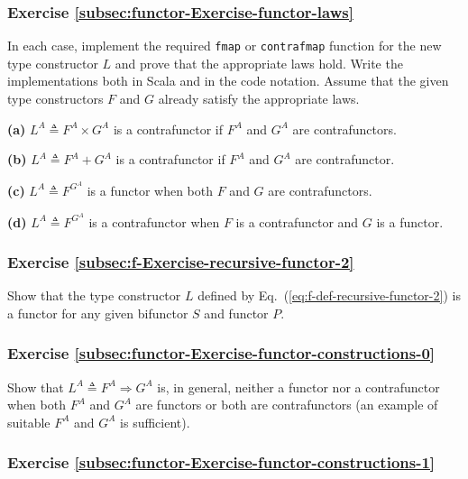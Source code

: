 \subsubsection{Exercise \label{subsec:functor-Exercise-functor-laws}\ref{subsec:functor-Exercise-functor-laws}}

In each case, implement the required \lstinline!fmap! or \lstinline!contrafmap!
function for the new type constructor $L$ and prove that the appropriate
laws hold. Write the implementations both in Scala and in the code
notation. Assume that the given type constructors $F$ and $G$ already
satisfy the appropriate laws.

\textbf{(a)} $L^{A}\triangleq F^{A}\times G^{A}$ is a contrafunctor
if $F^{A}$ and $G^{A}$ are contrafunctors.

\textbf{(b)} $L^{A}\triangleq F^{A}+G^{A}$ is a contrafunctor if
$F^{A}$ and $G^{A}$ are contrafunctor.

\textbf{(c)} $L^{A}\triangleq F^{G^{A}}$ is a functor when both $F$
and $G$ are contrafunctors.

\textbf{(d)} $L^{A}\triangleq F^{G^{A}}$ is a contrafunctor when
$F$ is a contrafunctor and $G$ is a functor.

\subsubsection{Exercise \label{subsec:f-Exercise-recursive-functor-2}\ref{subsec:f-Exercise-recursive-functor-2}}

Show that the type constructor $L$ defined by Eq.~(\ref{eq:f-def-recursive-functor-2})
is a functor for any given bifunctor $S$ and functor $P$. 

\subsubsection{Exercise \label{subsec:functor-Exercise-functor-constructions-0}\ref{subsec:functor-Exercise-functor-constructions-0}}

Show that $L^{A}\triangleq F^{A}\Rightarrow G^{A}$ is, in general,
neither a functor nor a contrafunctor when both $F^{A}$ and $G^{A}$
are functors or both are contrafunctors (an example of suitable $F^{A}$
and $G^{A}$ is sufficient).

\subsubsection{Exercise \label{subsec:functor-Exercise-functor-constructions-1}\ref{subsec:functor-Exercise-functor-constructions-1}}

